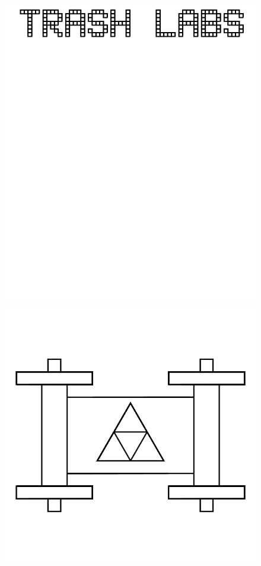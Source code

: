\documentclass[17pt]{extreport}
\begin{document}
	\begin{figure}
		\centering
		\includegraphics[width=6.25in]{imageserver/uploadimages/trashlabs.png}
	\end{figure}
	\begin{figure}
		\centering
		\includegraphics[width=7.75in]{imageserver/uploadimages/geometronscroll.png}
	\end{figure}
\end{document}
